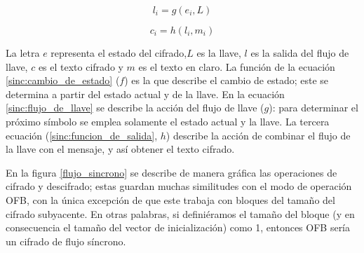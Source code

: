 \begin{equation}
  \label{sinc:flujo_de_llave}
  l_i = g(e_i, L)
\end{equation}

\begin{equation}
  \label{sinc:funcion_de_salida}
  c_i = h(l_i, m_i)
\end{equation}

\vspace{0.5cm}

La letra $ e $ representa el estado del cifrado,$ L $ es la llave, $ l $ es
la salida del flujo de llave, $ c $ es el texto cifrado y $ m $ es el texto en
claro. La función de la ecuación \ref{sinc:cambio_de_estado} ($ f $) es la que
describe el cambio de estado; este se determina a partir del estado actual y
de la llave. En la ecuación \ref{sinc:flujo_de_llave} se describe la acción del
flujo de llave ($ g $): para determinar el próximo símbolo se emplea solamente
el estado actual y la llave. La tercera ecuación (\ref{sinc:funcion_de_salida},
$ h $) describe la acción de combinar el flujo de la llave con el mensaje, y
así obtener el texto cifrado.


En la figura \ref{flujo_sincrono} se describe de manera gráfica las operaciones
de cifrado y descifrado; estas guardan muchas similitudes con el modo de
operación OFB, con la única excepción de que este trabaja con bloques del tamaño
del cifrado subyacente. En otras palabras, si definiéramos el tamaño del bloque
(y en consecuencia el tamaño del vector de inicialización) como 1, entonces
OFB sería un cifrado de flujo síncrono.

\vspace{0.5cm}


